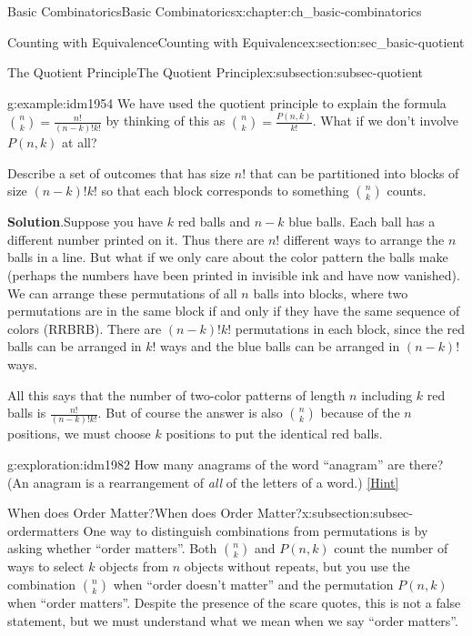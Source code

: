 \documentclass[oneside,10pt,]{book}
\numberwithin{equation}{chapter}
\begin{document}
\begin{chapterptx}{Basic Combinatorics}{}{Basic Combinatorics}{}{}{x:chapter:ch_basic-combinatorics}
\begin{sectionptx}{Counting with Equivalence}{}{Counting with Equivalence}{}{}{x:section:sec_basic-quotient}
\begin{subsectionptx}{The Quotient Principle}{}{The Quotient Principle}{}{}{x:subsection:subsec-quotient}
\begin{example}{}{g:example:idm1954}%
We have used the quotient principle to explain the formula \(\binom{n}{k} = \frac{n!}{(n-k)!k!}\) by thinking of this as \(\binom{n}{k} = \frac{P(n,k)}{k!}\).  What if we don't involve \(P(n,k)\) at all?%
\par
Describe a set of outcomes that has size \(n!\) that can be partitioned into blocks of size \((n-k)!k!\) so that each block corresponds to something \(\binom{n}{k}\) counts.%
\par\smallskip%
\noindent\textbf{Solution}.\hypertarget{g:solution:idm1964}{}\quad{}Suppose you have \(k\) red balls and \(n-k\) blue balls.  Each ball has a different number printed on it.  Thus there are \(n!\) different ways to arrange the \(n\) balls in a line.  But what if we only care about the color pattern the balls make (perhaps the numbers have been printed in invisible ink and have now vanished).  We can arrange these permutations of all \(n\) balls into blocks, where two permutations are in the same block if and only if they have the same sequence of colors (RRBRB\textellipsis{}).  There are \((n-k)!k!\) permutations in each block, since the red balls can be arranged in \(k!\) ways and the blue balls can be arranged in \((n-k)!\) ways.%
\par
All this says that the number of two-color patterns of length \(n\) including \(k\) red balls is \(\frac{n!}{(n-k)!k!}\).  But of course the answer is also \(\binom{n}{k}\) because of the \(n\) positions, we must choose \(k\) positions to put the identical red balls.%
\end{example}
\begin{exploration}{}{g:exploration:idm1982}%
How many anagrams of the word ``anagram'' are there? (An anagram is a rearrangement of \emph{all} of the letters of a word.)%
\space\hspace*{0pt}\hfill{\tiny\hyperlink{g:hint:idm1987-back}{[Hint]}}\end{exploration}
\end{subsectionptx}
%
%
\typeout{************************************************}
\typeout{************************************************}
%
\begin{subsectionptx}{When does Order Matter?}{}{When does Order Matter?}{}{}{x:subsection:subsec-ordermatters}
One way to distinguish combinations from permutations is by asking whether ``order matters''.  Both \(\binom{n}{k}\) and \(P(n,k)\) count the number of ways to select \(k\) objects from \(n\) objects without repeats, but you use the combination \(\binom{n}{k}\) when ``order doesn't matter'' and the permutation \(P(n,k)\) when ``order matters''.  Despite the presence of the scare quotes, this is not a false statement, but we must understand what we mean when we say ``order matters''.%

\end{subsectionptx}
\end{sectionptx}
\end{chapterptx}
\end{document}
